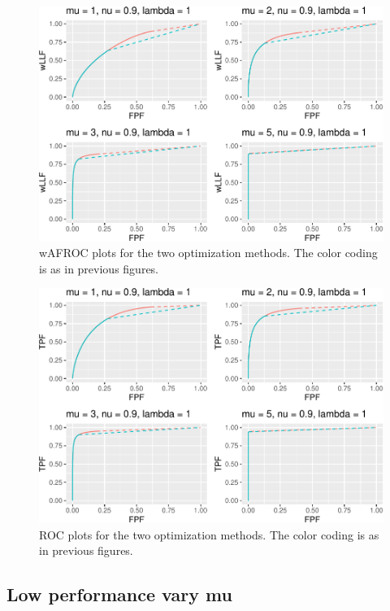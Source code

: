 \documentclass[
]{book}
\begin{document}
\begin{figure}
\centering
\includegraphics{21-optim-op-point_files/figure-latex/optim-op-point-high-performance-vary-mu-vary-all-wafroc-1.pdf}
\caption{\label{fig:optim-op-point-high-performance-vary-mu-vary-all-wafroc}wAFROC plots for the two optimization methods. The color coding is as in previous figures.}
\end{figure}

\begin{figure}
\centering
\includegraphics{21-optim-op-point_files/figure-latex/optim-op-point-high-performance-vary-mu-vary-all-roc-1.pdf}
\caption{\label{fig:optim-op-point-high-performance-vary-mu-vary-all-roc}ROC plots for the two optimization methods. The color coding is as in previous figures.}
\end{figure}

\hypertarget{optim-op-point-low-performance-vary-mu}{%
\subsection{Low performance vary mu}\label{optim-op-point-low-performance-vary-mu}}
\end{document}
